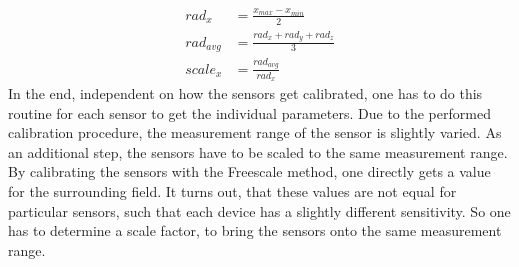 \begin{equation} \label{eq:simpleScale}
\begin{aligned}
rad_{x} &= \frac{x_{max} - x_{min}}{2}\\
rad_{avg} &= \frac{rad_{x} + rad_{y} + rad_{z}}{3}\\
scale_{x} &= \frac{rad_{avg}}{rad_{x}}
\end{aligned}
\end{equation}
In the end, independent on how the sensors get calibrated, one has to do this routine for each sensor to get the individual parameters. Due to the performed calibration procedure, the measurement range of the sensor is slightly varied. As an additional step, the sensors have to be scaled to the same measurement range. By calibrating the sensors with the Freescale method, one directly gets a value for the surrounding field. It turns out, that these values are not equal for particular sensors, such that each device has a slightly different sensitivity. So one has to determine a scale factor, to bring the sensors onto the same measurement range.


